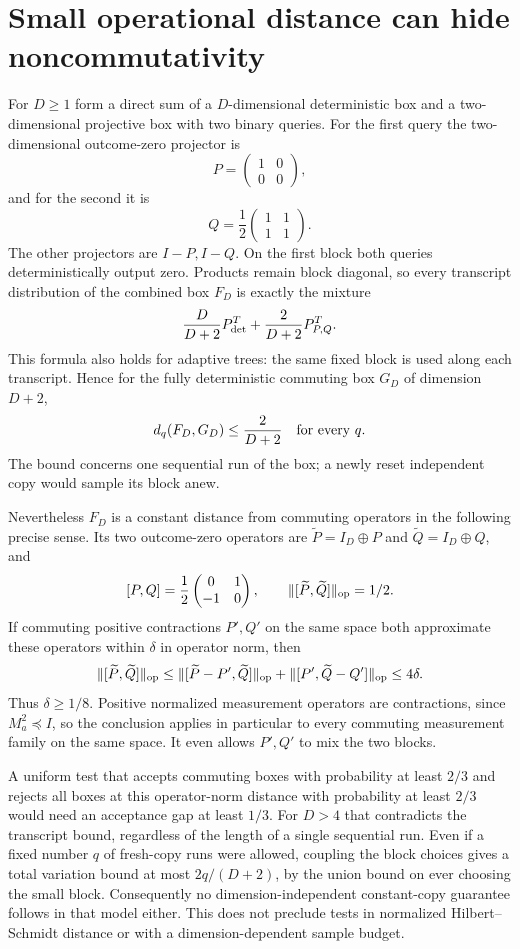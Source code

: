 \documentclass[11pt]{article}
\begin{document}
\section{Small operational distance can hide noncommutativity}
For $D\ge1$ form a direct sum of a $D$-dimensional deterministic
box and a two-dimensional projective box with two binary queries.
For the first query the two-dimensional outcome-zero projector is
\[
 P=\begin{pmatrix}1&0\\0&0\end{pmatrix},
\]
and for the second it is
\[
 Q=\frac12\begin{pmatrix}1&1\\1&1\end{pmatrix}.
\]
The other projectors are $I-P,I-Q$. On the first block both
queries deterministically output zero. Products remain block
diagonal, so every transcript distribution of the combined box
$F_D$ is exactly the mixture
\[
 \frac{D}{D+2}P_{\rm det}^T+\frac2{D+2}P_{P,Q}^T.
\]
This formula also holds for adaptive trees: the same fixed block
is used along each transcript. Hence for the fully deterministic
commuting box $G_D$ of dimension $D+2$,
\[
 d_q(F_D,G_D)\le\frac2{D+2}\quad\hbox{for every }q.
\]
The bound concerns one sequential run of the box; a newly reset
independent copy would sample its block anew.

Nevertheless $F_D$ is a constant distance from commuting
operators in the following precise sense. Its two outcome-zero
operators are $\widetilde P=I_D\oplus P$ and
$\widetilde Q=I_D\oplus Q$, and
\[
 [P,Q]=\frac12\begin{pmatrix}0&1\\-1&0\end{pmatrix},
 \qquad\|[\widetilde P,\widetilde Q]\|_{\rm op}=1/2.
\]
If commuting positive contractions $P',Q'$ on the same space
both approximate these operators within $\delta$ in operator
norm, then
\[
 \|[\widetilde P,\widetilde Q]\|_{\rm op}
 \le\|[\widetilde P-P',\widetilde Q]\|_{\rm op}
    +\|[P',\widetilde Q-Q']\|_{\rm op}\le4\delta.
\]
Thus $\delta\ge1/8$. Positive normalized measurement operators
are contractions, since $M_a^2\preceq I$, so the conclusion
applies in particular to every commuting measurement family on
the same space. It even allows $P',Q'$ to mix the two blocks.

A uniform test that accepts commuting boxes with probability at
least $2/3$ and rejects all boxes at this operator-norm distance
with probability at least $2/3$ would need an acceptance gap at
least $1/3$. For $D>4$ that contradicts the transcript bound,
regardless of the length of a single sequential run. Even if a
fixed number $q$ of fresh-copy runs were allowed, coupling the
block choices gives a total variation bound at most
$2q/(D+2)$, by the union bound on ever choosing the small block.
Consequently no dimension-independent constant-copy guarantee
follows in that model either. This does not preclude tests in
normalized Hilbert--Schmidt distance or with a dimension-dependent
sample budget.
\end{document}
